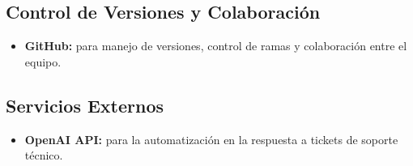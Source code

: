 \subsection{Control de Versiones y Colaboración}
\begin{itemize}
	\item \textbf{GitHub:} para manejo de versiones, control de ramas y colaboración entre el equipo.
\end{itemize}

\subsection{Servicios Externos}
\begin{itemize}
	\item \textbf{OpenAI API:} para la automatización en la respuesta a tickets de soporte técnico.
\end{itemize}
